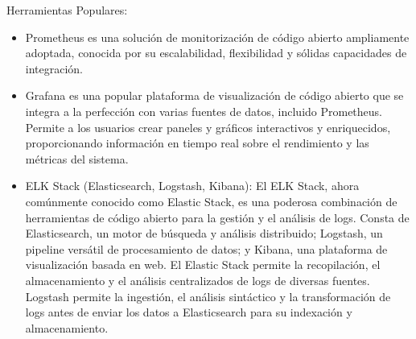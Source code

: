 \documentclass[12pt]{book}
\begin{document}
Herramientas Populares:
\begin{itemize}
    \item Prometheus es una solución de monitorización de código abierto ampliamente adoptada, conocida por su escalabilidad, flexibilidad y sólidas capacidades de integración.
    \item Grafana es una popular plataforma de visualización de código abierto que se integra a la perfección con varias fuentes de datos, incluido Prometheus. Permite a los usuarios crear paneles y gráficos interactivos y enriquecidos, proporcionando información en tiempo real sobre el rendimiento y las métricas del sistema.
    \item ELK Stack (Elasticsearch, Logstash, Kibana): El ELK Stack, ahora comúnmente conocido como Elastic Stack, es una poderosa combinación de herramientas de código abierto para la gestión y el análisis de logs. Consta de Elasticsearch, un motor de búsqueda y análisis distribuido; Logstash, un pipeline versátil de procesamiento de datos; y Kibana, una plataforma de visualización basada en web. El Elastic Stack permite la recopilación, el almacenamiento y el análisis centralizados de logs de diversas fuentes. Logstash permite la ingestión, el análisis sintáctico y la transformación de logs antes de enviar los datos a Elasticsearch para su indexación y almacenamiento.
\end{itemize}




\end{document}
